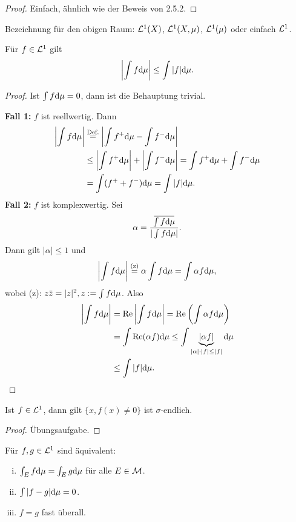 \documentclass[
 a4paper,
 12pt,
 parskip=half
 ]{scrreprt}
\theoremstyle{plain}
\theoremstyle{definition}
\numberwithin{equation}{section}
\begin{document}
\begin{proof}
 Einfach, ähnlich wie der Beweis von 2.5.2.
\end{proof}

Bezeichnung für den obigen Raum: $\mathcal{L}^1(X)$, $\mathcal{L}^1(X,\mu)$, $\mathcal{L}^1(\mu)$ oder einfach $\mathcal{L}^1$.

\begin{lem}
 Für $f \in \mathcal{L}^1$ gilt
 \[ \left| \int f \mathrm{d} \mu \right| \le \int |f| \mathrm{d} \mu. \]
\end{lem}

\begin{proof}
 Ist $\int f \mathrm{d} \mu = 0$, dann ist die Behauptung trivial.
 
 \textbf{Fall 1:} $f$ ist reellwertig. Dann
 \[ \begin{aligned}
     \left| \int f \mathrm{d} \mu \right| &\overset{\text{Def.}}{=} \left| \int f^+ \mathrm{d} \mu - \int f^- \mathrm{d} \mu \right| \\
     &\le \left| \int f^+ \mathrm{d} \mu \right| + \left| \int f^- \mathrm{d} \mu \right|
     = \int f^+ \mathrm{d} \mu + \int f^- \mathrm{d} \mu \\
     &= \int ( f^+ + f^- ) \mathrm{d} \mu = \int |f| \mathrm{d} \mu.
    \end{aligned} \]
 \textbf{Fall 2:} $f$ ist komplexwertig. Sei 
 \[ \alpha = \frac{ \obar{\int f  \diffop \mu} }{ | \int f \diffop \mu |}. \]
 Dann gilt $|\alpha| \le 1$ und
 \[ \left| \int f \mathrm{d} \mu \right| \overset{(\text{z})}{=} \alpha \int f \mathrm{d} \mu = \int \alpha f \mathrm{d} \mu, \]
 wobei (z): $z\obar{z} = |z|^2, z := \int f \diffop \mu$. Also
 \begin{align*}
  \left| \int f \mathrm{d} \mu \right| &= \operatorname{Re} \left| \int f \mathrm{d} \mu \right| = \operatorname{Re} \left( \int \alpha f \mathrm{d} \mu \right) \\
  &= \int \operatorname{Re} (\alpha f) \mathrm{d} \mu \le \int \underbrace{|\alpha f|}_{|\alpha|\cdot|f| \le |f|} \mathrm{d} \mu \\
  &\le \int |f| \mathrm{d} \mu. \qedhere
 \end{align*}
\end{proof}
 
\begin{lem}
 Ist $f \in \mathcal{L}^1$, dann gilt $\{ x, f(x) \ne 0 \}$ ist $\sigma$-endlich.  
\end{lem}

\begin{proof}
 Übungsaufgabe.
\end{proof}

\begin{lem}
 Für $f,g \in \mathcal{L}^1$ sind äquivalent:
 \begin{enumerate}[(i)]
  \item $\int_E f \mathrm{d} \mu =  \int_E g \mathrm{d} \mu$ für alle $E \in \mathcal{M}$.
  \item $\int |f-g| \mathrm{d} \mu = 0$.
  \item $f=g$ fast überall.
 \end{enumerate}
\end{lem}
\end{document}
